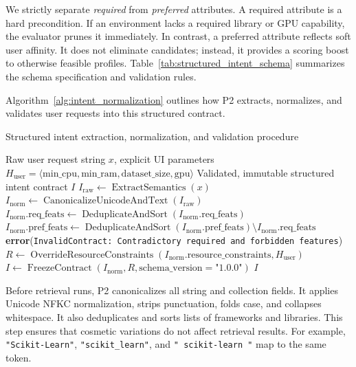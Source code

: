 We strictly separate \textit{required} from \textit{preferred} attributes. A required attribute is a hard precondition. If an environment lacks a required library or GPU capability, the evaluator prunes it immediately. In contrast, a preferred attribute reflects soft user affinity. It does not eliminate candidates; instead, it provides a scoring boost to otherwise feasible profiles. Table~\ref{tab:structured_intent_schema} summarizes the schema specification and validation rules.



Algorithm~\ref{alg:intent_normalization} outlines how P2 extracts, normalizes, and validates user requests into this structured contract.

\begin{algorithm}[ht]{Structured intent extraction, normalization, and validation procedure}
\label{alg:intent_normalization}
\begin{algorithmic}[1]
\Require Raw user request string $x$, explicit UI parameters $H_{\mathrm{user}} = \langle \mathrm{min\_cpu}, \mathrm{min\_ram}, \mathrm{dataset\_size}, \mathrm{gpu} \rangle$
\Ensure Validated, immutable structured intent contract $I$
\State $I_{\mathrm{raw}} \gets \operatorname{ExtractSemantics}(x)$ 
\State $I_{\mathrm{norm}} \gets \operatorname{CanonicalizeUnicodeAndText}(I_{\mathrm{raw}})$
\State $I_{\mathrm{norm}}.\mathrm{req\_feats} \gets \operatorname{DeduplicateAndSort}(I_{\mathrm{norm}}.\mathrm{req\_feats})$
\State $I_{\mathrm{norm}}.\mathrm{pref\_feats} \gets \operatorname{DeduplicateAndSort}(I_{\mathrm{norm}}.\mathrm{pref\_feats}) \setminus I_{\mathrm{norm}}.\mathrm{req\_feats}$ 
    \State \Return \textbf{error}(\texttt{InvalidContract: Contradictory required and forbidden features})
\EndIf
\State $R \gets \operatorname{OverrideResourceConstraints}(I_{\mathrm{norm}}.\mathrm{resource\_constraints}, H_{\mathrm{user}})$ 
\State $I \gets \operatorname{FreezeContract}(I_{\mathrm{norm}}, R, \text{schema\_version}=\text{"1.0.0"})$
\State \Return $I$
\end{algorithmic}
\end{algorithm}

Before retrieval runs, P2 canonicalizes all string and collection fields. It applies Unicode NFKC normalization, strips punctuation, folds case, and collapses whitespace. It also deduplicates and sorts lists of frameworks and libraries. This step ensures that cosmetic variations do not affect retrieval results. For example, \texttt{"Scikit-Learn"}, \texttt{"scikit\_learn"}, and \texttt{" scikit-learn "} map to the same token. 

